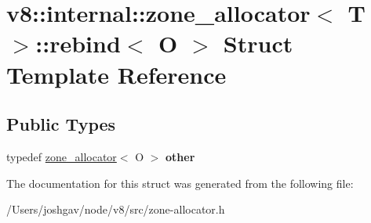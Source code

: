 \hypertarget{structv8_1_1internal_1_1zone__allocator_1_1rebind}{}\section{v8\+:\+:internal\+:\+:zone\+\_\+allocator$<$ T $>$\+:\+:rebind$<$ O $>$ Struct Template Reference}
\label{structv8_1_1internal_1_1zone__allocator_1_1rebind}
\subsection*{Public Types}
\begin{DoxyCompactItemize}
\item 
typedef \hyperlink{classv8_1_1internal_1_1zone__allocator}{zone\+\_\+allocator}$<$ O $>$ {\bfseries other}\hypertarget{structv8_1_1internal_1_1zone__allocator_1_1rebind_af5838e2755c3d110555b592c5557a08d}{}\label{structv8_1_1internal_1_1zone__allocator_1_1rebind_af5838e2755c3d110555b592c5557a08d}

\end{DoxyCompactItemize}


The documentation for this struct was generated from the following file\+:\begin{DoxyCompactItemize}
\item 
/\+Users/joshgav/node/v8/src/zone-\/allocator.\+h\end{DoxyCompactItemize}
